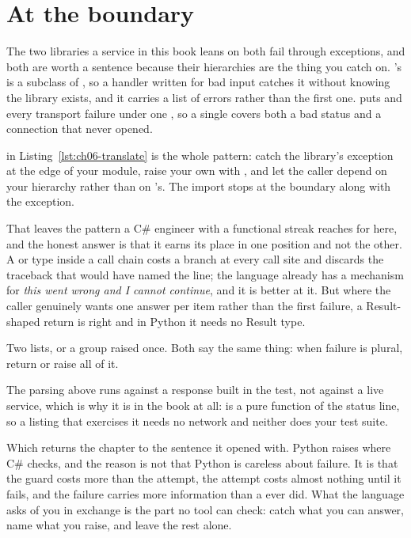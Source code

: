 \section{At the boundary}
\label{sec:ch06-boundary}

The two libraries a service in this book leans on both fail through
exceptions, and both are worth a sentence because their hierarchies are the
thing you catch on. 's  is a subclass of
, so a handler written for bad input catches it without
knowing the library exists, and it carries a list of errors rather than the
first one.  puts  and every transport
failure under one , so a single  covers both a
bad status and a connection that never opened.

 in Listing~\ref{lst:ch06-translate} is the whole pattern:
catch the library's exception at the edge of your module, raise your own
with , and let the caller depend on your hierarchy rather than on
's. The import stops at the boundary along with the exception.

That leaves the pattern a C\# engineer with a functional streak reaches for
here, and the honest answer is that it earns its place in one position and
not the other. A  or  type inside a call chain
costs a branch at every call site and discards the traceback that would have
named the line; the language already has a mechanism for \emph{this went
wrong and I cannot continue}, and it is better at it. But where the caller
genuinely wants one answer per item rather than the first failure, a
Result-shaped return is right \dash{} and in Python it needs no Result type.


\noindent
Two lists, or a group raised once. Both say the same thing: when failure is
plural, return or raise all of it.

\begin{warning}
The parsing above runs against a response built in the test, not against a
live service, which is why it is in the book at all: 
is a pure function of the status line, so a listing that exercises it needs
no network and neither does your test suite.
\end{warning}

\noindent
Which returns the chapter to the sentence it opened with. Python raises where
C\# checks, and the reason is not that Python is careless about failure. It
is that the guard costs more than the attempt, the attempt costs almost
nothing until it fails, and the failure carries more information than a
 ever did. What the language asks of you in exchange is the part
no tool can check: catch what you can answer, name what you raise, and leave
the rest alone.

